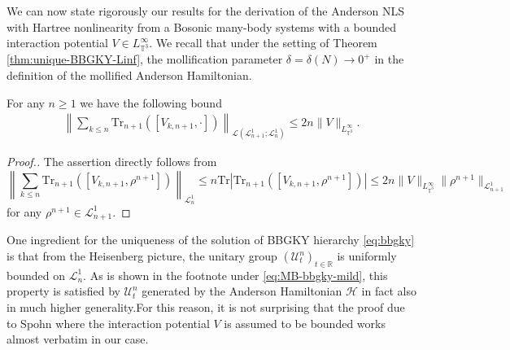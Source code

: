 We can now state rigorously our results for the derivation of the Anderson NLS
with Hartree nonlinearity from a Bosonic many-body systems with a bounded
interaction potential $V \in L_{\mathbb{T}^3}^{\infty}$. We recall that under
the setting of Theorem \ref{thm:unique-BBGKY-Linf}, the mollification
parameter $\delta = \delta (N) \rightarrow 0^+$ in the definition of the
mollified Anderson Hamiltonian.

\begin{lem}
  \label{lem:Spohn}For any $n \geqslant 1$ we have the following bound
  \begin{align}
    \left\| \sum_{k \leqslant n} \mathrm{Tr}_{n + 1} ([V_{k, n + 1}, \cdot])
    \right\|_{\mathcal{L} (\mathcal{L}_{n + 1}^1 ; \mathcal{L}^1_n)} \leqslant
    2 n \| V \|_{L_{\mathbb{T}^3}^{\infty}} . \label{eq:normCnn1}
  \end{align}
\end{lem}

\begin{proof}[Proof.]
  The assertion directly follows from
  \[ \left\| \sum_{k \leqslant n} \mathrm{Tr}_{n + 1} ([V_{k, n + 1}, \rho^{n +
     1}]) \right\|_{\mathcal{L}^1_n} \leq n \mathrm{Tr} \left| \mathrm{Tr}_{n + 1}
     \left([V_{k, n + 1}, \rho^{n + 1}]\right) \right| \leq 2 n \| V
     \|_{L_{\mathbb{T}^3}^{\infty}} \| \rho^{n + 1} \|_{\mathcal{L}_{n + 1}^1}
  \]
  for any $\rho^{n + 1} \in \mathcal{L}_{n + 1}^1$.
\end{proof}

One ingredient for the uniqueness of the
solution of BBGKY hierarchy \eqref{eq:bbgky} is that from the Heisenberg
picture, the unitary group $(\mathcal{U}_t^n)_{t \in \mathbb{R}}$ is uniformly
bounded on $\mathcal{L}^1_n$. As is shown in the footnote under \eqref{eq:MB-bbgky-mild}, this
property is satisfied by $\mathcal{U}_t^n$ generated by the Anderson
Hamiltonian $\mathcal{H}$ in fact also in much higher generality.For this reason, it is not surprising that the proof due to Spohn {\cite{S80}} where the interaction potential $V$ is assumed to be
bounded works almost verbatim in our case.

